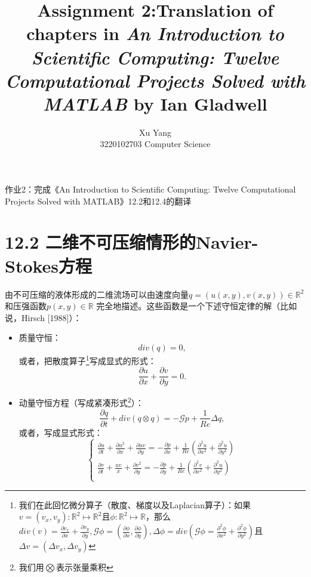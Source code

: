 \documentclass[nofonts]{ctexart} %
\title{Assignment 2:Translation of chapters in \textit{An Introduction to Scientific Computing: Twelve Computational Projects Solved with MATLAB} by Ian Gladwell}
\author{Xu Yang \\ 3220102703 Computer Science}
\begin{document}
\maketitle


作业2：完成《An Introduction to Scientific Computing: Twelve Computational Projects Solved with MATLAB》12.2和12.4的翻译\cite{intro}
\section{12.2 二维不可压缩情形的Navier-Stokes方程}
由不可压缩的液体形成的二维流场可以由速度向量$q = (u(x,y),v(x,y))\in \mathbb{R}^2 $ 
和压强函数$p(x,y)\in \mathbb{R}$ 完全地描述。这些函数是一个下述守恒定律的解（比如说，Hirsch [1988]）：
\begin{itemize}
\item   质量守恒：
        \begin{equation} \label{eq:div}
            div(q)=0,
        \end{equation}
或者，把散度算子\footnote{我们在此回忆微分算子（散度、梯度以及Laplacian算子）：如果$v=(v_x,v_y):\mathbb{R}^2 \longmapsto \mathbb{R}^2$且$\phi:\mathbb{R}^2 \longmapsto \mathbb{R}$，那么$div(v)=\frac{\partial v_x}{\partial x}+\frac{\partial v_y}{\partial y},\mathcal{G}\phi=(\frac{\partial\phi}{\partial x},\frac{\partial\phi}{\partial y}), \Delta \phi=div(\mathcal{G\phi}=\frac{\partial^2\phi}{\partial x^2}+\frac{\partial^2\phi}{\partial y^2})$且$\Delta v=(\Delta v_x,\Delta v_y)$}写成显式的形式：
        \begin{equation} \label{eq:div2}
            \frac{\partial u}{\partial x}+\frac{\partial v}{\partial y}=0.
        \end{equation}
\item   动量守恒方程（写成紧凑形式\footnote{我们用$\bigotimes$表示张量乘积}）：
        \begin{equation} \label{eq:momentum}
            \frac{\partial q}{\partial t}+div(q\otimes q)=-\mathcal{G}p +\frac{1}{Re} \Delta q,
        \end{equation}
或者，写成显式形式：
        \begin{equation} \label{eq:momentum2}
            \begin{cases}
            
            \frac{\partial u}{\partial t}+\frac{\partial u^2}{\partial x}+\frac{\partial uv}{\partial y}=-\frac{\partial p}{\partial x}+\frac{1}{Re}(\frac{\partial^2 u}{\partial x^2}+\frac{\partial^2 u}{\partial y^2})\\
            \frac{\partial v}{\partial t}+\frac{uv}{x}+\frac{\partial v^2}{\partial y}=-\frac{\partial p}{\partial y}+\frac{1}{Re}(\frac{\partial^2 v}{\partial x^2}+\frac{\partial^2 u}{\partial y^2})\\
            \end{cases}
        \end{equation} 
\end{itemize}
\end{document}
